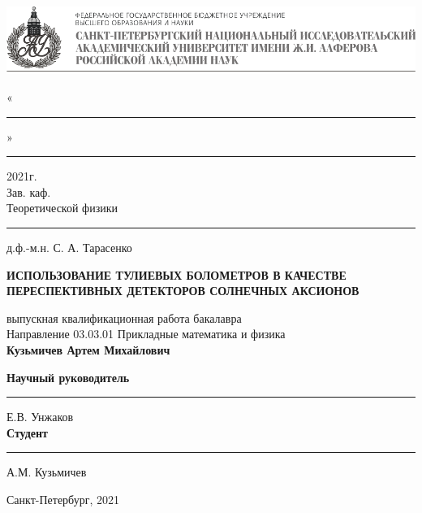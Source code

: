 
\begin{titlepage}


\vspace{15mm}
\begin{center}
    \includegraphics[width = \textwidth]{images/autitle.png}
\end{center}

\vspace{0.1mm}

\begin{flushright}
    «\rule{1cm}{0.15mm}» \rule{2cm}{0.15mm} 2021г. \\
    Зав. каф. \\
    Теоретической физики \\
    \rule{25mm}{0.20mm} д.ф.-м.н. С. А. Тарасенко \\
\end{flushright}


\begin{center}

\vspace{9mm}
\textbf{\large ИСПОЛЬЗОВАНИЕ ТУЛИЕВЫХ БОЛОМЕТРОВ В КАЧЕСТВЕ ПЕРЕСПЕКТИВНЫХ ДЕТЕКТОРОВ СОЛНЕЧНЫХ АКСИОНОВ}
\vspace{9mm}

выпускная квалификационная работа бакалавра \\
\vspace{10mm}
Направление 03.03.01 Прикладные математика и физика \\
\vspace{14mm}
\textbf{\large Кузьмичев Артем Михайлович}


\vspace{16mm}

\textbf{Научный руководитель} \hfill \rule{6.5cm}{0.15mm} Е.В. Унжаков \\
\vspace{5mm}
\textbf{Студент} \hfill  \rule{6cm}{0.15mm} А.М. Кузьмичев

\vfill 

{Санкт-Петербург, 2021}
\end{center}
\end{titlepage}
\restoregeometry
\addtocounter{page}{1}